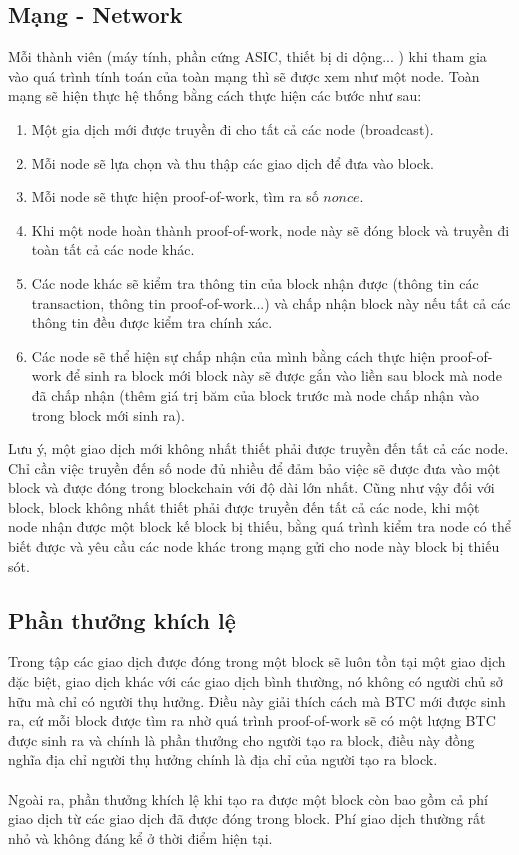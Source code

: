 \subsection{Mạng - Network}
Mỗi thành viên (máy tính, phần cứng ASIC, thiết bị di dộng... ) khi tham gia vào quá 
trình tính toán của toàn mạng thì sẽ được xem như một node. Toàn mạng sẽ hiện thực hệ 
thống bằng cách thực hiện các bước như sau:
\begin{enumerate}
\item Một gia dịch mới được truyền đi cho tất cả các node (broadcast).
\item Mỗi node sẽ lựa chọn và thu thập các giao dịch để đưa vào block.
\item Mỗi node sẽ thực hiện proof-of-work, tìm ra số $nonce$.
\item Khi một node hoàn thành proof-of-work, node này sẽ đóng block và truyền 
đi toàn tất cả các node khác.
\item Các node khác sẽ kiểm tra thông tin của block nhận được (thông tin các 
transaction, thông tin proof-of-work...) và chấp nhận block này nếu tất cả 
các thông tin đều được kiểm tra chính xác.
\item Các node sẽ thể hiện sự chấp nhận của mình bằng cách thực hiện proof-of-work 
để sinh ra block mới block này sẽ được gắn vào liền sau block mà node đã chấp nhận 
(thêm giá trị băm của block trước mà node chấp nhận vào trong block mới sinh ra).
\end{enumerate}
Lưu ý, một giao dịch mới không nhất thiết phải được truyền đến tất cả các node. 
Chỉ cần việc truyền đến số node đủ nhiều để đảm bảo việc sẽ được đưa vào một block 
và được đóng trong blockchain với độ dài lớn nhất. Cũng như vậy đối với block, 
block không nhất thiết phải được truyền đến tất cả các node, khi một node nhận 
được một block kế block bị thiếu, bằng quá trình kiểm tra node có thể biết được 
và yêu cầu các node khác trong mạng gửi cho node này block bị thiếu sót.
\subsection{Phần thưởng khích lệ}
Trong tập các giao dịch được đóng trong một block sẽ luôn tồn tại một giao dịch 
đặc biệt, giao dịch khác với các giao dịch bình thường, nó không có người chủ 
sở hữu mà chỉ có người thụ hưởng. Điều này giải thích cách mà BTC mới được sinh 
ra, cứ mỗi block được tìm ra nhờ quá trình proof-of-work sẽ có một lượng BTC 
được sinh ra và chính là phần thưởng cho người tạo ra block, điều này đồng nghĩa 
địa chỉ người thụ hưởng chính là địa chỉ của người tạo ra block.\\\\
Ngoài ra, phần thưởng khích lệ khi tạo ra được một block còn bao gồm cả phí giao 
dịch từ các giao dịch đã được đóng trong block. Phí giao dịch thường rất nhỏ và
không đáng kể ở thời điểm hiện tại.\\\\
